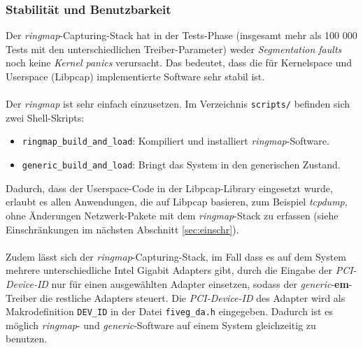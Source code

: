 \subsubsection{Stabilität und Benutzbarkeit}\label{sec:stab_und_func}
Der \emph{ringmap}-Capturing-Stack hat in der Tests-Phase (insgesamt mehr als
100 000 Tests mit den unterschiedlichen Treiber-Parameter) weder
\emph{Segmentation faults} noch keine \emph{Kernel panics} verursacht. Das
bedeutet, dass die für Kernelspace und Userspace (Libpcap) implementierte
Software sehr stabil ist.\\\\
%
Der \emph{ringmap} ist sehr einfach einzusetzen. Im Verzeichnis 
\verb+scripts/+ befinden sich zwei Shell-Skripts:
\begin{itemize}
	\item \verb+ringmap_build_and_load+: Kompiliert und installiert \emph{ringmap}-Software. 
	\item \verb+generic_build_and_load+: Bringt das System in den generischen Zustand. 
\end{itemize}
Dadurch, dass der Userspace-Code in der Libpcap-Library eingesetzt wurde,
erlaubt es allen Anwendungen, die auf Libpcap basieren, zum Beispiel \emph{tcpdump},
ohne Änderungen  Netzwerk-Pakete mit dem \emph{ringmap}-Stack zu erfassen
(siehe Einschränkungen im nächsten Abschnitt \ref{sec:einschr}).\\\\
%
Zudem lässt sich der \emph{ringmap}-Capturing-Stack, im Fall dass es auf dem 
System mehrere unterschiedliche Intel Gigabit Adapters gibt, durch die 
Eingabe der \emph{PCI-Device-ID} nur für einen ausgewählten Adapter einsetzen, 
sodass der \emph{generic}-\textbf{em}-Treiber die restliche Adapters steuert. 
Die \emph{PCI-Device-ID} des Adapter wird als Makrodefinition \verb+DEV_ID+ in der 
Datei \verb+fiveg_da.h+ eingegeben. Dadurch ist es möglich \emph{ringmap}- und 
\emph{generic}-Software auf einem System gleichzeitig zu benutzen.

